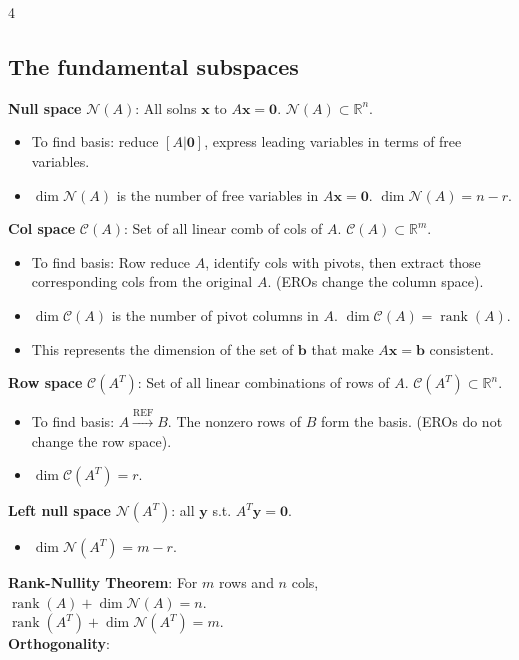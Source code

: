 \documentclass[9pt]{extarticle}
\begin{document}
\begin{multicols*}{4}
\subsection*{The fundamental subspaces}
\textbf{Null space} $\mathcal{N}(A)$: All solns $\mathbf{x}$ to $A\mathbf{x}=\mathbf{0}$. $\mathcal{N}(A)\subset\mathbb{R}^{n}$.
\begin{itemize}
    \item To find basis: reduce $[A|\mathbf{0}]$, express leading variables in terms of free variables.
    \item $\dim\mathcal{N}(A)$ is the number of free variables in $A\mathbf{x}=\mathbf{0}$. $\dim\mathcal{N}(A) = n - r$.
\end{itemize}
\textbf{Col space} $\mathcal{C}(A)$: Set of all linear comb of cols of $A$. $\mathcal{C}(A)\subset\mathbb{R}^{m}$.
\begin{itemize}
    \item To find basis: Row reduce $A$, identify cols with pivots, then extract those corresponding cols from the original $A$. (EROs change the column space).
    \item $\dim\mathcal{C}(A)$ is the number of pivot columns in $A$. $\dim\mathcal{C}(A) = \operatorname{rank}(A)$.
    \item This represents the dimension of the set of $\mathbf{b}$ that make $A\mathbf{x}=\mathbf{b}$ consistent.
\end{itemize}
\textbf{Row space} $\mathcal{C}(A^{T})$: Set of all linear combinations of rows of $A$. $\mathcal{C}(A^{T})\subset\mathbb{R}^{n}$.
\begin{itemize}
    \item To find basis: $A \xrightarrow{\text{REF}} B$. The nonzero rows of $B$ form the basis. (EROs do not change the row space).
    \item $\dim\mathcal{C}(A^T) = r$.
\end{itemize}
\textbf{Left null space} $\mathcal{N}(A^T)$: all $\mathbf{y}$ s.t. $A^T\mathbf{y}=\mathbf{0}$.
\begin{itemize}
    \item $\dim \mathcal{N}(A^T) = m - r$.
\end{itemize}
\textbf{Rank-Nullity Theorem}: For $m$ rows and $n$ cols,\\
$\operatorname{rank}(A)+\dim\mathcal{N}(A)=n$.\\
$\operatorname{rank}(A^T)+\dim\mathcal{N}(A^T)=m$.\\
\textbf{Orthogonality}:
\begin{itemize}

\end{itemize}
\end{multicols*}
\end{document}
